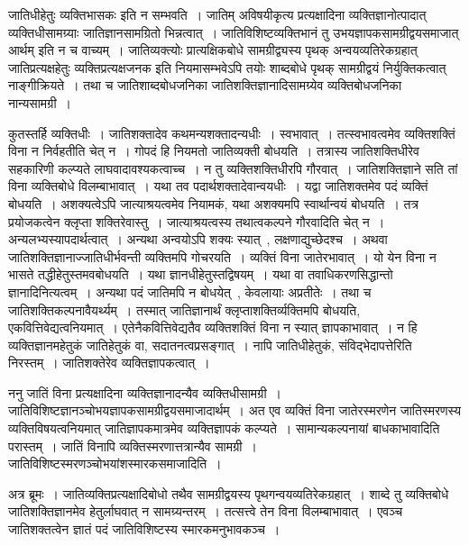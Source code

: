 				जातिधीहेतुः व्यक्तिभासकः इति न सम्भवति~। जातिम् अविषयीकृत्य प्रत्यक्षादिना व्यक्तिज्ञानोत्पादात् व्यक्तिधीसामग्र्याः जातिज्ञानसामग्रितो भिन्नत्वात्~। जातिविशिष्टव्यक्तिभानं तु उभयज्ञापकसामग्रीद्वयसमाजात् आर्थम् इति न च वाच्यम्~। जातिव्यक्त्योः  प्रात्यक्षिकबोधे सामग्रीद्व्यस्य पृथक् अन्वयव्यतिरेकग्रहात् जातिप्रत्यक्षहेतुः व्यक्तिप्रत्यक्षजनक इति नियमासम्भवेऽपि तयोः शाब्दबोधे पृथक् सामग्रीद्वयं निर्युक्तिकत्वात् नाङ्गीक्रियते~। तथा च जातिशाब्दबोधजनिका जातिशक्तिज्ञानादिसामग्र्येव व्यक्तिबोधजनिका नान्यसामग्री~।

				\begin{small}

					कुतस्तर्हि व्यक्तिधीः~। जातिशक्तादेव कथमन्यशक्तादन्यधीः~। स्वभावात्~। तत्स्वभावत्वमेव व्यक्तिशक्तिं विना न निर्वहतीति चेत् न~। गोपदं हि नियमतो जातिव्यक्ती बोधयति~। तत्रास्य जातिशक्तिधीरेव सहकारिणी कल्प्यते लाघवादावश्यकत्वाच्च~। न तु व्यक्तिशक्तिधीरपि गौरवात्~। जातिशक्तिज्ञाने सति तां विना व्यक्तिबोधे विलम्बाभावात्~। यथा तव पदार्थशक्तादेवान्वयधीः~। यद्वा जातिशक्तमेव पदं व्यक्तिं बोधयति~। अशक्यत्वेऽपि जात्याश्रयत्वमेव नियामकं, यथा अशक्यमपि स्वार्थान्वयं बोधयति~। तत्र प्रयोजकत्वेन क्लृप्ता शक्तिरेवास्तु~। जात्याश्रयत्वस्य तथात्वकल्पने गौरवादिति चेत् न~। अन्यलभ्यस्यापदार्थत्वात्~। अन्यथा अन्वयोऽपि शक्यः स्यात्~, लक्षणाद्युच्छेदश्च~। अथवा जातिशक्तिज्ञानाज्जातिधीर्भवन्ती व्यक्तिमपि गोचरयति~। व्यक्तिं विना जातेरभावात्~। यो येन विना न भासते तद्धीहेतुस्तमवबोधयति~। यथा ज्ञानधीहेतुस्तद्विषयम्~। यथा वा तवाधिकरणसिद्धान्तो ज्ञानादिनित्यत्वम्~। अन्यथा पदं जातिमपि न बोधयेत्~, केवलायाः अप्रतीतेः~। तथा च जातिशक्तिकल्पनावैयर्थ्यम्~। तस्मात् जातिज्ञानार्थं क्लृप्ताशक्तिर्व्यक्तिमपि बोधयति, एकवित्तिवेद्यत्वनियमात्~। एतेनैकवित्तिवेद्यतैव व्यक्तिशक्तिं विना न स्यात् ज्ञापकाभावात्~। न हि व्यक्तिज्ञानमहेतुकं जातिहेतुकं वा, सदातनत्वप्रसङ्गात्~। नापि जातिधीहेतुकं, संविद्भेदापत्तेरिति निरस्तम्~। जातिशक्तेरेव व्यक्तिज्ञापकत्वात्~। 

					ननु जातिं विना प्रत्यक्षादिना व्यक्तिज्ञानादन्यैव व्यक्तिधीसामग्री~। जातिविशिष्टज्ञानञ्चोभयज्ञापकसामग्रीद्वयसमाजादार्थम्~। अत एव व्यक्तिं विना जातेरस्मरणेन जातिस्मरणस्य व्यक्तिविषयत्वनियमात् जातिज्ञापकमात्रमेव व्यक्तिज्ञापकं कल्प्यते~। सामान्यकल्पनायां बाधकाभावादिति परास्तम्~। जातिं विनापि व्यक्तिस्मरणात्तत्रान्यैव सामग्री~। जातिविशिष्टस्मरणञ्चोभयांशस्मारकसमाजादिति~।

					अत्र ब्रूमः~। जातिव्यक्तिप्रत्यक्षादिबोधो तथैव सामग्रीद्वयस्य पृथगन्वयव्यतिरेकग्रहात्~। शाब्दे तु व्यक्तिबोधे जातिशक्तिज्ञानमेव हेतुर्लाघवात् न सामग्र्यन्तरम्~। तत्सत्त्वे तेन विना विलम्बाभावात्~। एवञ्च जातिशक्तत्वेन ज्ञातं पदं जातिविशिष्टस्य स्मारकमनुभावकञ्च~।
				\end{small}

